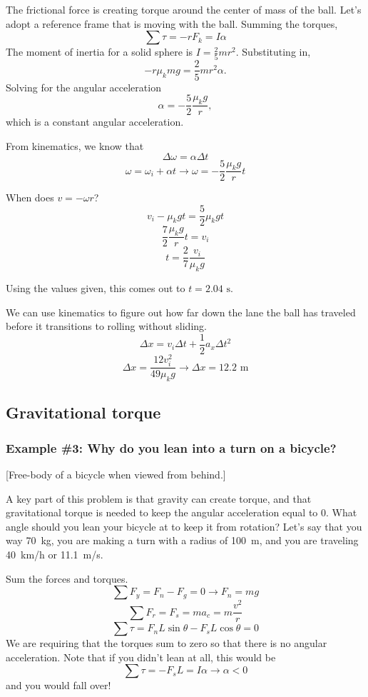 The frictional force is creating torque around the center of mass of the ball. Let's adopt a reference frame that is moving with the ball. Summing the torques,
$$\sum \tau = -rF_k = I\alpha$$
The moment of inertia for a solid sphere is $I=\frac{2}{5}mr^2$. Substituting in,
$$-r\mu_kmg = \frac{2}{5}mr^2\alpha.$$
Solving for the angular acceleration
$$\alpha = -\frac{5}{2}\frac{\mu_kg}{r},$$
which is a constant angular acceleration.

From kinematics, we know that
$$\Delta \omega = \alpha \Delta t$$
$$\omega = \omega_i + \alpha t \rightarrow \boxed{\omega = -\frac{5}{2}\frac{\mu_kg}{r}t}$$

When does $v=-\omega r$?
$$v_i-\mu_k gt = \frac{5}{2}\mu_kgt$$
$$\frac{7}{2}\frac{\mu_kg}{r}t = v_i$$
$$t = \frac{2}{7}\frac{v_i}{\mu_kg}$$

Using the values given, this comes out to $\boxed{t=2.04\mbox{ s}}$.

We can use kinematics to figure out how far down the lane the ball has traveled before it transitions to rolling without sliding.
$$\Delta x = v_i\Delta t + \frac{1}{2}a_x\Delta t^2$$ 
$$\Delta x = \frac{12v_i^2}{49\mu_kg} \rightarrow \boxed{\Delta x=12.2\mbox{ m}}$$



\subsection{Gravitational torque}
\subsubsection*{Example \#3: Why do you lean into a turn on a bicycle?}
[Free-body of a bicycle when viewed from behind.]
\vspace{4cm}               

A key part of this problem is that gravity can create torque, and that gravitational torque is needed to keep the angular acceleration equal to 0. What angle should you lean your bicycle at to keep it from rotation? Let's say that you way 70~kg, you are making a turn with a radius of 100~m, and you are traveling 40~km/h or 11.1~m/s.

Sum the forces and torques.
$$\sum F_y = F_n - F_g = 0 \rightarrow F_n = mg$$
$$\sum F_r = F_s = ma_c = m\frac{v^2}{r}$$
$$\sum \tau = F_nL\sin\theta-F_sL\cos\theta = 0$$
We are requiring that the torques sum to zero so that there is no angular acceleration. Note that if you didn't lean at all, this would be
$$\sum \tau = -F_sL=I\alpha \rightarrow \alpha<0$$
and you would fall over!

